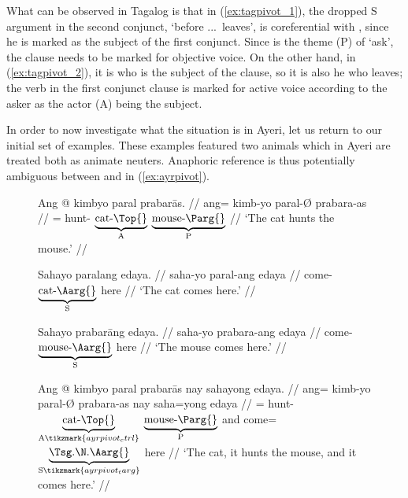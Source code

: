 What can be observed in Tagalog is that in (\ref{ex:tagpivot_1}), the dropped S
argument in the second conjunct,  `before ...\ leaves', is
coreferential with , since he is marked as the subject of the first
conjunct. Since  is the theme (P) of  `ask', the clause
needs to be marked for objective voice. On the other hand, in
(\ref{ex:tagpivot_2}), it is  who is the subject of the clause, so it
is also he who leaves; the verb in the first conjunct clause is marked for
active voice according to the asker as the actor (A) being the subject.

In order to now investigate what the situation is in Ayeri, let us return to
our initial set of examples. These examples featured two animals which in Ayeri
are treated both as animate neuters. Anaphoric reference is thus potentially
ambiguous between  and  in
(\ref{ex:ayrpivot}).

\begin{figure}
\pex\label{ex:ayrpivot}%
\a\label{ex:ayrpivot_1}
	\begingl
		\gla Ang @ kimbyo paral prabarās. //
		\glb ang= kimb-yo paral-Ø prabara-as //
		\glc \AgtT{}= hunt-\TsgN{}
			$\underbrace{\text{cat-\Top{}}}_{\text{A}}$
			$\underbrace{\text{mouse-\Parg{}}}_{\text{P}}$ //
		\glft `The cat hunts the mouse.' //
	\endgl
	
\a\label{ex:ayrpivot_2}%
	\begingl
		\gla Sahayo paralang edaya. //
		\glb saha-yo paral-ang edaya //
		\glc come-\TsgN{} $\underbrace{\text{cat-\Aarg{}}}_{\text{S}}$
			here //
		\glft `The cat comes here.' //
	\endgl
	
\a\label{ex:ayrpivot_3}%
	\begingl
		\gla Sahayo prabarāng edaya. //
		\glb saha-yo prabara-ang edaya //
		\glc come-\TsgN{} $\underbrace{\text{mouse-\Aarg{}}}_{\text{S}}$
			here //
		\glft `The mouse comes here.' //
	\endgl
	
\a\label{ex:ayrpivot_4}%
	\begingl[aboveglftskip=1em]
		\gla Ang @ kimbyo paral prabarās nay sahayong edaya. //
		\glb ang= kimb-yo paral-Ø prabara-as nay saha=yong edaya  //
		\glc \AgtT{}= hunt-\TsgN{}
			$\underbrace{\text{cat-\Top{}}}_{\text{A}\tikzmark{ayrpivot_ctrl}}$
			$\underbrace{\text{mouse-\Parg{}}}_{\text{P}}$
			and
			come=$\underbrace{\text{\smash{\TsgN{}}.\Aarg{}}}_%
				{\text{S}\tikzmark{ayrpivot_targ}}$
			here //
		\glft `The cat, it hunts the mouse, and it comes here.' //
	\endgl

\xe
\end{figure}

